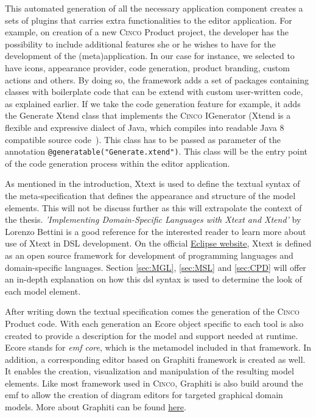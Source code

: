This automated generation of all the necessary application component creates a sets of plugins that carries extra functionalities to the editor application. For example, on creation of a new \textsc{Cinco} Product project, the developer has the possibility to include additional features she or he wishes to have for the development of the (meta)application. In our case for instance, we selected to have icons, appearance provider, code generation, product branding, custom actions and others. By doing so, the framework adds a set of packages containing classes with boilerplate code that can be extend with custom user-written code, as explained earlier. If we take the code generation feature for example, it adds the Generate Xtend class that implements the \textsc{Cinco} IGenerator (Xtend is a flexible and expressive dialect of Java, which compiles into readable Java 8 compatible source code~\cite{Xtend}). This class has to be passed as parameter of the annotation \lstinline[language=MGL]{@generatable("Generate.xtend")}. This class will be the entry point of the code generation process within the editor application.

As mentioned in the introduction, Xtext is used to define the textual syntax of the meta-specification that defines the appearance and structure of the model elements. This will not be discuss further as this will extrapolate the context of the thesis.  \textit{'Implementing Domain-Specific Languages with Xtext and Xtend'} by Lorenzo Bettini is a good reference for the interested reader to learn more about use of Xtext in DSL development. On the official \href{https://www.eclipse.org/Xtext/}{Eclipse website}, Xtext is defined as an open source framework for development of programming languages and domain-specific languages. Section \ref{sec:MGL}, \ref{sec:MSL} and \ref{sec:CPD} will offer an in-depth explanation on how this \acrshort{dsl} syntax is used to determine the look of each model element.

After writing down the textual specification comes the generation of the \textsc{Cinco} Product code. With each generation an Ecore object specific to each tool is also created to provide a description for the model and support needed at runtime. Ecore stands for \textit{\acrfull{emf} core}, which is the metamodel included in that framework. In addition, a corresponding editor based on Graphiti framework is created as well. It enables the creation, visualization and manipulation of the resulting model elements. Like most framework used in \textsc{Cinco}, Graphiti is also build around the \acrshort{emf} to allow the creation of diagram editors for targeted graphical domain models. More about Graphiti can be found \href{https://www.eclipse.org/graphiti/}{here}.

